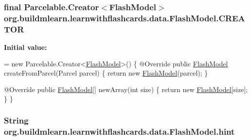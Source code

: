 \subsubsection[{\texorpdfstring{C\+R\+E\+A\+T\+OR}{CREATOR}}]{\setlength{\rightskip}{0pt plus 5cm}final Parcelable.\+Creator$<${\bf Flash\+Model}$>$ org.\+buildmlearn.\+learnwithflashcards.\+data.\+Flash\+Model.\+C\+R\+E\+A\+T\+OR\hspace{0.3cm}{\ttfamily [static]}}\hypertarget{classorg_1_1buildmlearn_1_1learnwithflashcards_1_1data_1_1FlashModel_a3ddafc448f054610541a3f420012aa23}{}\label{classorg_1_1buildmlearn_1_1learnwithflashcards_1_1data_1_1FlashModel_a3ddafc448f054610541a3f420012aa23}
{\bfseries Initial value\+:}
\begin{DoxyCode}
= \textcolor{keyword}{new} Parcelable.Creator<\hyperlink{classorg_1_1buildmlearn_1_1learnwithflashcards_1_1data_1_1FlashModel_a08830a18728180ccd9df9831873eea02}{FlashModel}>() \{
        @Override
        \textcolor{keyword}{public} \hyperlink{classorg_1_1buildmlearn_1_1learnwithflashcards_1_1data_1_1FlashModel_a08830a18728180ccd9df9831873eea02}{FlashModel} createFromParcel(Parcel parcel) \{
            \textcolor{keywordflow}{return} \textcolor{keyword}{new} \hyperlink{classorg_1_1buildmlearn_1_1learnwithflashcards_1_1data_1_1FlashModel_a08830a18728180ccd9df9831873eea02}{FlashModel}(parcel);
        \}

        @Override
        \textcolor{keyword}{public} \hyperlink{classorg_1_1buildmlearn_1_1learnwithflashcards_1_1data_1_1FlashModel_a08830a18728180ccd9df9831873eea02}{FlashModel}[] newArray(\textcolor{keywordtype}{int} size) \{
            \textcolor{keywordflow}{return} \textcolor{keyword}{new} \hyperlink{classorg_1_1buildmlearn_1_1learnwithflashcards_1_1data_1_1FlashModel_a08830a18728180ccd9df9831873eea02}{FlashModel}[size];
        \}
    \}
\end{DoxyCode}
\subsubsection[{\texorpdfstring{hint}{hint}}]{\setlength{\rightskip}{0pt plus 5cm}String org.\+buildmlearn.\+learnwithflashcards.\+data.\+Flash\+Model.\+hint\hspace{0.3cm}{\ttfamily [private]}}\hypertarget{classorg_1_1buildmlearn_1_1learnwithflashcards_1_1data_1_1FlashModel_a3545eb9b2046dca7d26e34e56c8b800c}{}\label{classorg_1_1buildmlearn_1_1learnwithflashcards_1_1data_1_1FlashModel_a3545eb9b2046dca7d26e34e56c8b800c}
